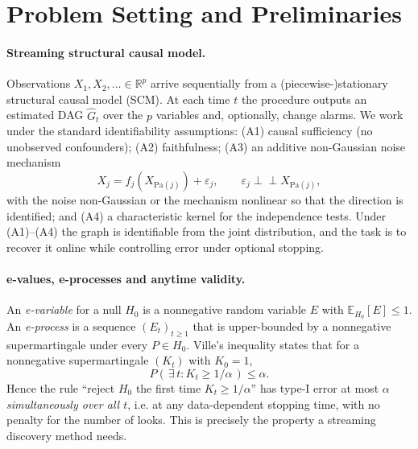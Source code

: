 \documentclass[preprint,12pt,authoryear]{elsarticle}
\begin{document}
\section{Problem Setting and Preliminaries}
\label{sec:prelim}
\paragraph{Streaming structural causal model.}
Observations $X_1, X_2, \dots \in \mathbb{R}^p$ arrive sequentially from a
(piecewise-)stationary structural causal model (SCM). At each time $t$ the
procedure outputs an estimated DAG $\hat G_t$ over the $p$ variables and,
optionally, change alarms. We work under the standard identifiability
assumptions: (A1) causal sufficiency (no unobserved confounders); (A2)
faithfulness; (A3) an additive non-Gaussian noise mechanism
\begin{equation}
    X_j = f_j\!\left(X_{\mathrm{Pa}(j)}\right) + \varepsilon_j,
    \qquad \varepsilon_j \perp\!\!\!\perp X_{\mathrm{Pa}(j)},
    \label{eq:anm}
\end{equation}
with the noise non-Gaussian or the mechanism nonlinear so that the direction is
identified; and (A4) a characteristic kernel for the independence tests. Under
(A1)--(A4) the graph is identifiable from the joint distribution, and the task
is to recover it online while controlling error under optional stopping.

\paragraph{e-values, e-processes and anytime validity.}
An \emph{e-variable} for a null $H_0$ is a nonnegative random variable $E$ with
$\mathbb{E}_{H_0}[E] \le 1$. An \emph{e-process} is a sequence $(E_t)_{t\ge 1}$
that is upper-bounded by a nonnegative supermartingale under every
$P \in H_0$. Ville's inequality states that for a nonnegative supermartingale
$(K_t)$ with $K_0 = 1$,
\begin{equation}
    P\!\left(\, \exists\, t : K_t \ge 1/\alpha \,\right) \le \alpha .
    \label{eq:ville}
\end{equation}
Hence the rule ``reject $H_0$ the first time $K_t \ge 1/\alpha$'' has type-I
error at most $\alpha$ \emph{simultaneously over all $t$}, i.e. at any
data-dependent stopping time, with no penalty for the number of looks. This is
precisely the property a streaming discovery method needs.
\end{document}
